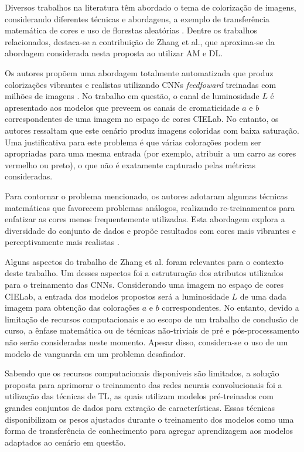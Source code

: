 Diversos trabalhos na literatura têm abordado o tema de colorização de imagens, considerando diferentes técnicas e abordagens, a exemplo de transferência matemática de cores e uso de florestas aleatórias  \cite{ref:rel-zhang,ref:rel-deshpande,ref:rel-welsh}. Dentre os trabalhos relacionados, destaca-se a contribuição de Zhang et al., que aproxima-se da abordagem considerada nesta proposta ao utilizar AM e DL.

Os autores propõem uma abordagem totalmente automatizada que produz colorizações vibrantes e realistas utilizando CNNs \emph{feedfoward} treinadas com milhões de imagens \cite{ref:rel-zhang}. No trabalho em questão, o canal de luminosidade $L$ é apresentado aos modelos que preveem os canais de cromaticidade $a$ e $b$ correspondentes de uma imagem no espaço de cores CIELab. No entanto, os autores ressaltam que este cenário produz imagens coloridas com baixa saturação. Uma justificativa para este problema é que várias colorações podem ser apropriadas para uma mesma entrada (por exemplo, atribuir a um carro as cores vermelho ou preto), o que não é exatamente capturado pelas métricas consideradas.

Para contornar o problema mencionado, os autores adotaram algumas técnicas matemáticas que favorecem problemas análogos, realizando re-treinamentos para enfatizar as cores menos frequentemente utilizadas. Esta abordagem explora a diversidade do conjunto de dados e propõe resultados com cores mais vibrantes e perceptivamente mais realistas \cite{ref:rel-zhang}.


Alguns aspectos do trabalho de Zhang et al. foram relevantes para o contexto deste trabalho. Um desses aspectos foi a estruturação dos atributos utilizados para o treinamento das CNNs. Considerando uma imagem no espaço de cores CIELab, a entrada dos modelos propostos será a luminosidade $L$ de uma dada imagem para obtenção das colorações $a$ e $b$ correspondentes. No entanto, devido a limitação de recursos computacionais e ao escopo de um trabalho de conclusão de curso, a ênfase matemática ou de técnicas não-triviais de pré e pós-processamento não serão consideradas neste momento. Apesar disso, considera-se o uso de um modelo de vanguarda em um problema desafiador.

Sabendo que os recursos computacionais disponíveis são limitados, a solução proposta para aprimorar o treinamento das redes neurais convolucionais foi a utilização das técnicas de TL, as quais utilizam modelos pré-treinados com grandes conjuntos de dados para extração de características. Essas técnicas disponibilizam os pesos ajustados durante o treinamento dos modelos como uma forma de transferência de conhecimento para agregar aprendizagem aos modelos adaptados ao cenário em questão.
